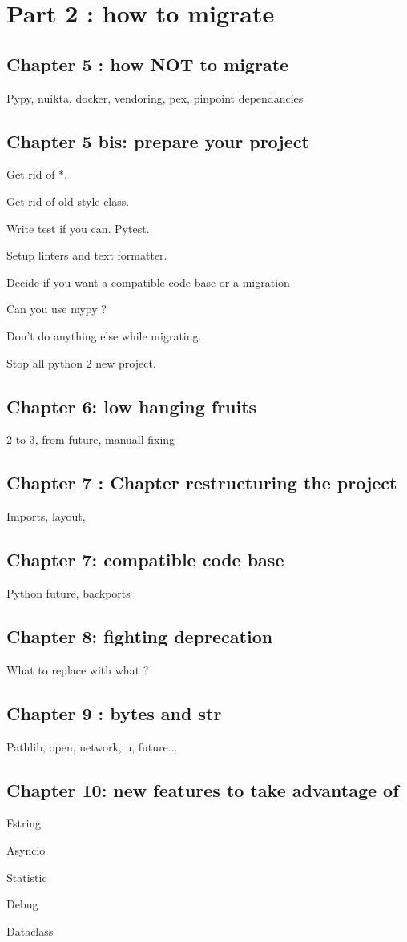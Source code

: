 \documentclass[a4paper, 12pt]{book}
\begin{document}
\part{Part 2 : how to migrate}

\chapter{Chapter 5 : how NOT to migrate}

Pypy, nuikta, docker, vendoring, pex, pinpoint dependancies

\chapter{Chapter 5 bis: prepare your project}

Get rid of *.

Get rid of old style class.

Write test if you can. Pytest.

Setup linters and text formatter.

Decide if you want a compatible code base or a migration

Can you use mypy ?

Don't do anything else while migrating.

Stop all python 2 new project.

\chapter{Chapter 6: low hanging fruits}

2 to 3, from future, manuall fixing

\chapter{Chapter 7 : Chapter restructuring the project}

Imports, layout,

\chapter{Chapter 7: compatible code base}

Python future, backports

\chapter{Chapter 8: fighting deprecation}

What to replace with what ?

\chapter{Chapter 9 : bytes and str}

Pathlib, open, network, u, future...

\chapter{Chapter 10: new features to take advantage of}

Fstring

Asyncio

Statistic

Debug

Dataclass





\appendix

\backmatter %
\end{document}
